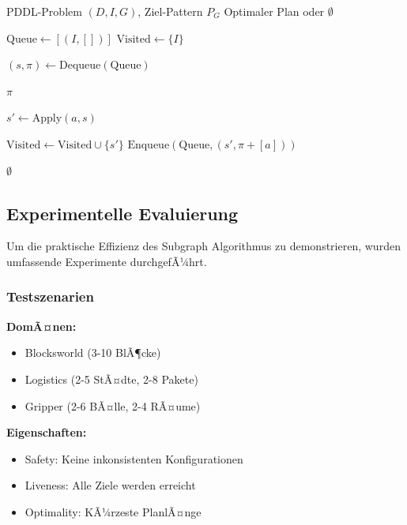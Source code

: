 ﻿\documentclass[a4paper,12pt]{article}
\theoremstyle{definition}
\begin{document}
\begin{algorithm}[H]
	\caption{Subgraph-basierte optimale Plansuche}
	\label{alg:optimal_planning}
	\begin{algorithmic}[1]
		\Eingabe PDDL-Problem $(D, I, G)$, Ziel-Pattern $P_G$
		\Ausgabe Optimaler Plan oder $\emptyset$
		
		\State $\text{Queue} \gets [(I, [])]$ 
		\State $\text{Visited} \gets \{I\}$
		
		\State $(s, \pi) \gets \text{Dequeue}(\text{Queue})$
		
		 
		\State \Return $\pi$ 
		\EndeWenn
		
		\State $s' \gets \text{Apply}(a, s)$
		
		\State $\text{Visited} \gets \text{Visited} \cup \{s'\}$
		\State $\text{Enqueue}(\text{Queue}, (s', \pi + [a]))$
		\EndeWenn
		\EndeFuer
		\EndeWaehrend
		
		\State \Return $\emptyset$ 
	\end{algorithmic}
\end{algorithm}

\subsection{Experimentelle Evaluierung}

Um die praktische Effizienz des Subgraph Algorithmus zu demonstrieren, wurden umfassende Experimente durchgefÃ¼hrt.

\subsubsection{Testszenarien}

\textbf{DomÃ¤nen:}
\begin{itemize}
	\item[-] Blocksworld (3-10 BlÃ¶cke)
	\item[-] Logistics (2-5 StÃ¤dte, 2-8 Pakete)
	\item[-] Gripper (2-6 BÃ¤lle, 2-4 RÃ¤ume)
\end{itemize}

\textbf{Eigenschaften:}
\begin{itemize}
	\item[-] Safety: Keine inkonsistenten Konfigurationen
	\item[-] Liveness: Alle Ziele werden erreicht
	\item[-] Optimality: KÃ¼rzeste PlanlÃ¤nge
\end{itemize}
\end{document}
